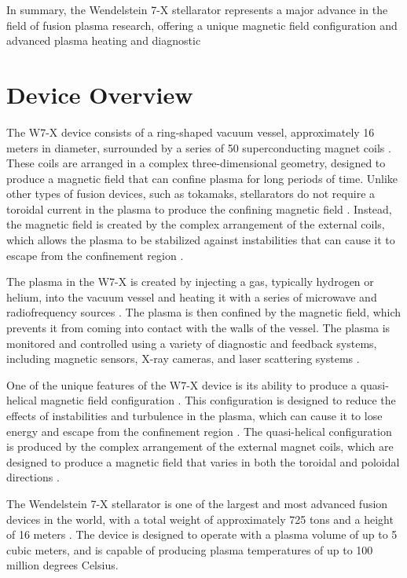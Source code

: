 \documentclass[12pt]{article}
\begin{document}
In summary, the Wendelstein 7-X stellarator represents a major advance in the field of fusion plasma research, offering a unique magnetic field configuration and advanced plasma heating and diagnostic

\section{Device Overview}

The W7-X device consists of a ring-shaped vacuum vessel, approximately 16 meters in diameter, surrounded by a series of 50 superconducting magnet coils \cite{w7x-website}. These coils are arranged in a complex three-dimensional geometry, designed to produce a magnetic field that can confine plasma for long periods of time. Unlike other types of fusion devices, such as tokamaks, stellarators do not require a toroidal current in the plasma to produce the confining magnetic field \cite{stix}. Instead, the magnetic field is created by the complex arrangement of the external coils, which allows the plasma to be stabilized against instabilities that can cause it to escape from the confinement region \cite{hutchinson}.

The plasma in the W7-X is created by injecting a gas, typically hydrogen or helium, into the vacuum vessel and heating it with a series of microwave and radiofrequency sources \cite{w7x-website}. The plasma is then confined by the magnetic field, which prevents it from coming into contact with the walls of the vessel. The plasma is monitored and controlled using a variety of diagnostic and feedback systems, including magnetic sensors, X-ray cameras, and laser scattering systems \cite{w7x-website}.

One of the unique features of the W7-X device is its ability to produce a quasi-helical magnetic field configuration \cite{w7x-website}. This configuration is designed to reduce the effects of instabilities and turbulence in the plasma, which can cause it to lose energy and escape from the confinement region \cite{militello}. The quasi-helical configuration is produced by the complex arrangement of the external magnet coils, which are designed to produce a magnetic field that varies in both the toroidal and poloidal directions \cite{w7x-website}.

The Wendelstein 7-X stellarator is one of the largest and most advanced fusion devices in the world, with a total weight of approximately 725 tons and a height of 16 meters \cite{w7x-technical-details}. The device is designed to operate with a plasma volume of up to 5 cubic meters, and is capable of producing plasma temperatures of up to 100 million degrees Celsius.
\end{document}
